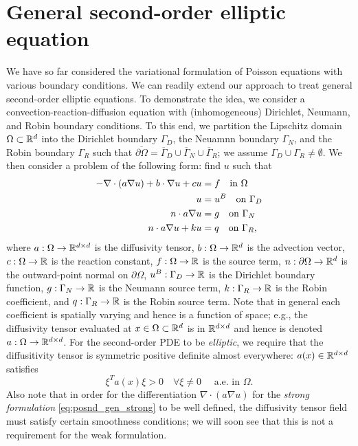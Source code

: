 


\section{General second-order elliptic equation}
We have so far considered the variational formulation of Poisson equations with various boundary conditions. We can readily extend our approach to treat general second-order elliptic equations. To demonstrate the idea, we consider a convection-reaction-diffusion equation with (inhomogeneous) Dirichlet, Neumann, and Robin boundary conditions. To this end, we partition the Lipschitz domain $\Omega \subset \mathbb{R}^d$ into the Dirichlet boundary $\Gamma_D$, the Neuamnn boundary $\Gamma_N$, and the Robin boundary $\Gamma_R$ such that $\overline{\partial \Omega} = \overline{\Gamma}_D \cup \overline{\Gamma}_N \cup \overline{\Gamma}_R$; we assume $\Gamma_D \cup \Gamma_R \neq \emptyset$. We then consider a problem of the following form: find $u$ such that
\begin{align}
  - \nabla \cdot (a \nabla u) + b \cdot \nabla u + c u &= f \quad \text{in } \Omega
  \notag \\
  u &= u^B \quad \text{on } \Gamma_D \label{eq:posnd_gen_strong} \\
  n \cdot a \nabla u &= g \quad \text{on } \Gamma_N \notag \\
  n \cdot a \nabla u + k u &= q \quad \text{on } \Gamma_R, \notag
\end{align}
where $a: \Omega \to \mathbb{R}^{d \times d}$ is the diffusivity tensor, $b: \Omega \to \mathbb{R}^d$ is the advection vector, $c: \Omega \to \mathbb{R}$ is the reaction constant, $f: \Omega \to \mathbb{R}$ is the source term,  $n: \partial \Omega \to \mathbb{R}^d$ is the outward-point normal on $\partial \Omega$, $u^B: \Gamma_D \to \mathbb{R}$ is the Dirichlet boundary function, $g: \Gamma_N \to \mathbb{R}$ is the Neumann source term, $k: \Gamma_R \to \mathbb{R}$ is the Robin coefficient, and $q: \Gamma_R \to \mathbb{R}$ is the Robin source term.  Note that in general each coefficient is spatially varying and hence is a function of space; e.g., the diffusivity tensor evaluated at $x \in \Omega \subset \mathbb{R}^d$ is in $\mathbb{R}^{d \times d}$ and hence is denoted $a: \Omega \to \mathbb{R}^{d \times d}$.  For the second-order PDE to be \emph{elliptic}, we require that the diffusitivity tensor is symmetric positive definite almost everywhere: $a(x) \in \mathbb{R}^{d \times d}$ satisfies
\begin{equation*}
  \xi^T a(x) \xi > 0 \quad \forall \xi \neq 0 \quad \text{ a.e. in } \Omega.
\end{equation*}
Also note that in order for the differentiation $\nabla \cdot ( a \nabla u)$ for the \emph{strong formulation} \eqref{eq:posnd_gen_strong} to be well defined, the diffusivity tensor field must satisfy certain smoothness conditions; we will soon see that this is not a requirement for the weak formulation.

